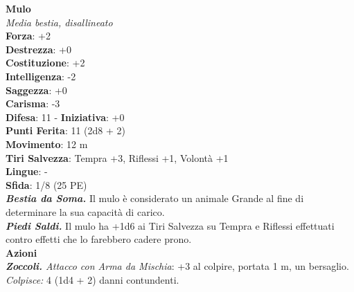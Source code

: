 \begin{multicols}{2}
\medskip\textbf{Mulo}\\
\emph{Media bestia, disallineato}\\
\textbf{Forza}: +2\\
\textbf{Destrezza}: +0\\
\textbf{Costituzione}: +2\\
\textbf{Intelligenza}: -2\\
\textbf{Saggezza}: +0\\
\textbf{Carisma}: -3\\
\textbf{Difesa}: 11 - \textbf{Iniziativa}: +0\\
\textbf{Punti Ferita}: 11 (2d8 + 2)\\
\textbf{Movimento}: 12 m\\
\textbf{Tiri Salvezza}: Tempra +3, Riflessi +1, Volontà +1 \\
\textbf{Lingue}: -\\
\textbf{Sfida}: 1/8 (25 PE)\smallskip\\
\emph{\textbf{Bestia da Soma.}} Il mulo è considerato un animale Grande al fine di determinare la sua capacità di carico.\\
\emph{\textbf{Piedi Saldi.}} Il mulo ha +1d6 ai Tiri Salvezza su Tempra e Riflessi effettuati contro effetti che lo farebbero cadere prono.\\
\smallskip\textbf{Azioni}\\
\emph{\textbf{Zoccoli.} Attacco con Arma da Mischia}: +3 al colpire, portata 1 m, un bersaglio.\\
\emph{Colpisce:} 4 (1d4 + 2) danni contundenti.\\



\end{multicols}
